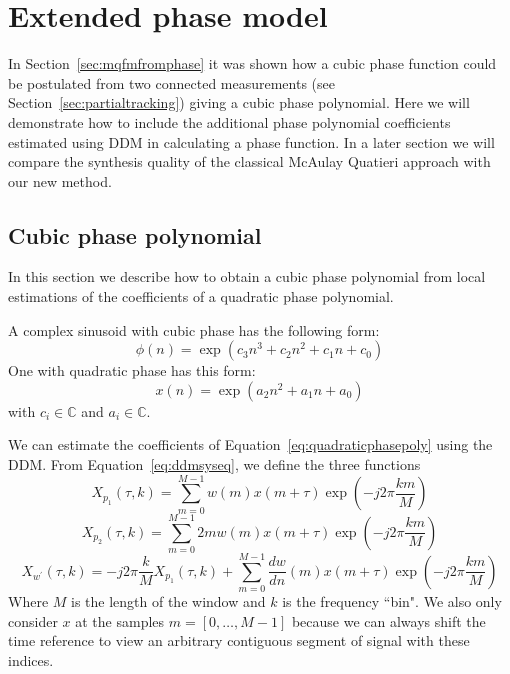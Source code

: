 \chapter{Extended phase model}

In Section~\ref{sec:mqfmfromphase} it was shown how a cubic phase function could
be postulated from two connected measurements (see
Section~\ref{sec:partialtracking}) giving a cubic phase polynomial. Here we will
demonstrate how to include the additional phase polynomial coefficients
estimated using DDM in calculating a phase function. In a later section we will
compare the synthesis quality of the classical McAulay \textendash Quatieri
approach with our new method.

\section{Cubic phase polynomial\label{sec:cubicphasepoly} }

In this section we describe how to obtain a cubic phase polynomial from
local estimations of the coefficients of a quadratic phase polynomial.

A complex sinusoid with cubic phase has the following form:
\begin{equation}
    \label{eq:cubicphasepoly}
    \phi(n) = \exp \left(c_3 n^{3} + c_2 n^{2} + c_1 n + c_0 \right)
\end{equation}
One with quadratic phase has this form:
\begin{equation}
    \label{eq:quadraticphasepoly}
    x(n) = \exp \left(a_2 n^{2} + a_1 n + a_0 \right)
\end{equation}
with $c_{i} \in \mathbb{C}$ and $a_{i} \in \mathbb{C}$.

We can estimate the coefficients of Equation~\ref{eq:quadraticphasepoly} using the DDM. From
Equation~\ref{eq:ddmsyseq}, we define the three functions
\begin{equation}
    X_{p_{1}} \left( \tau, k \right)
    =
    \sum_{m=0}^{M-1} w(m) x(m + \tau) \exp(-j 2 \pi \frac{k m}{M})
\end{equation}
\begin{equation}
    X_{p_{2}} \left( \tau, k \right)
    =
    \sum_{m=0}^{M-1} 2 m w(m) x(m + \tau) \exp(-j 2 \pi \frac{k m}{M})
\end{equation}
\begin{equation}
    X_{w^{\prime}} \left( \tau, k \right)
    =
    -j 2 \pi \frac{k}{M} X_{p_{1}} \left( \tau , k \right) + 
    \sum_{m=0}^{M-1} \frac{dw}{dn}(m) x(m + \tau) \exp(-j 2 \pi \frac{k m}{M})
\end{equation}
Where $M$ is the length of the window and $k$ is the frequency ``bin". We also
only consider $x$ at the samples $m = [0, \dotsc, M-1]$ because we can always
shift the time reference to view an arbitrary contiguous segment of signal with
these indices.

